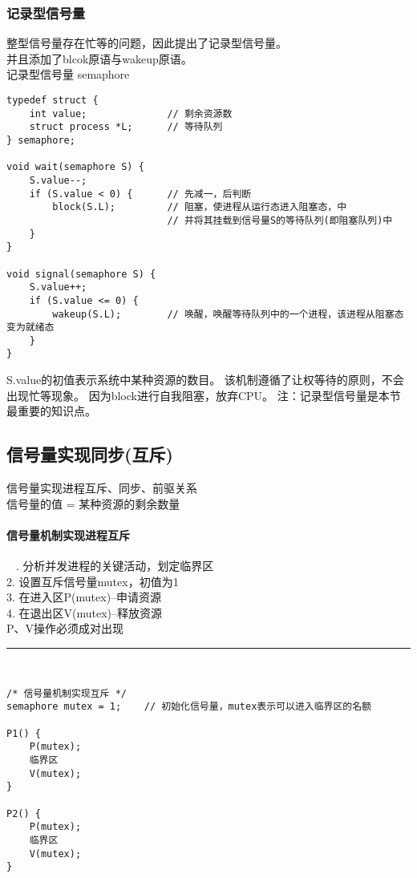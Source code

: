 \subsubsection{记录型信号量} 整型信号量存在忙等的问题，因此提出了记录型信号量。 \\
并且添加了blcok原语与wakeup原语。  \\
记录型信号量 semaphore \\

\begin{lstlisting}
typedef struct {
	int value;				// 剩余资源数
	struct process *L;		// 等待队列
} semaphore;

void wait(semaphore S) {
	S.value--;
	if (S.value < 0) {		// 先减一，后判断
		block(S.L);			// 阻塞，使进程从运行态进入阻塞态，中
							// 并将其挂载到信号量S的等待队列(即阻塞队列)中
	}
}

void signal(semaphore S) {
	S.value++;
	if (S.value <= 0) {
		wakeup(S.L);		// 唤醒，唤醒等待队列中的一个进程，该进程从阻塞态变为就绪态
	}
}
\end{lstlisting}
\noindent
S.value的初值表示系统中某种资源的数目。
\noindent
该机制遵循了让权等待的原则，不会出现忙等现象。
因为block进行自我阻塞，放弃CPU。
\noindent
注：记录型信号量是本节最重要的知识点。

\subsection{信号量实现同步(互斥)} \noindent
信号量实现进程互斥、同步、前驱关系 \\
信号量的值 = 某种资源的剩余数量 \\

\paragraph{信号量机制实现进程互斥}~{}
. 分析并发进程的关键活动，划定临界区 \\ 
2. 设置互斥信号量mutex，初值为1 \\ 
3. 在进入区P(mutex)--申请资源 \\
4. 在退出区V(mutex)--释放资源 \\
P、V操作必须成对出现  \\
\rule[-10pt]{14.3cm}{0.05em} \\

\begin{lstlisting}
/* 信号量机制实现互斥 */
semaphore mutex = 1;	// 初始化信号量，mutex表示可以进入临界区的名额 

P1() {
	P(mutex);
	临界区
	V(mutex);
}

P2() {
	P(mutex);
	临界区
	V(mutex);
}

\end{lstlisting}

